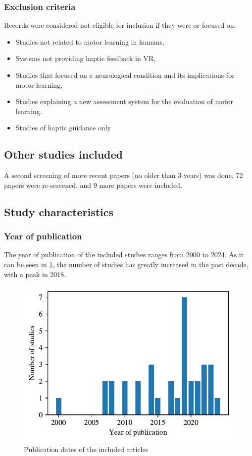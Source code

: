 \documentclass[conference]{IEEEtran}
\begin{document}
\subsubsection{Exclusion criteria}
\label{sec:exclusion}
Records were considered not eligible for inclusion if they were or focused on:
\begin{itemize}
    \item Studies not related to motor learning in humans,
    \item Systems not providing haptic feedback in VR,
    \item Studies that focused on a neurological condition and its implications for motor learning,
    \item Studies explaining a new assessment system for the evaluation of motor learning.
    \item Studies of haptic guidance only
\end{itemize}

\subsection{Other studies included}
A second screening of more recent papers (no older than 3 years) was done. 72 papers were re-screened, and 9 more papers were included.

\subsection{Study characteristics}

\subsubsection{Year of publication}
The year of publication of the included studies ranges from 2000 to 2024. As it can be seen in \ref{fig:years}, the number of studies has greatly increased in the past decade, with a peak in 2018.

\begin{figure}[ht]
    \centering
    \includegraphics[width=\columnwidth]{years.pdf} 
    \caption{Publication dates of the included articles}
    \label{fig:years}
\end{figure}
\end{document}
